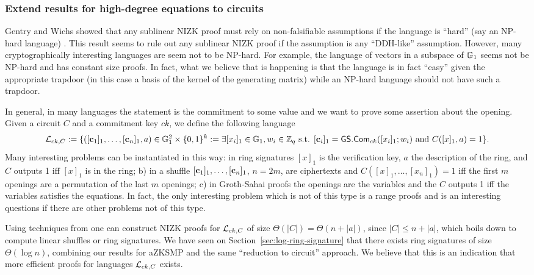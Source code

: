 \subsubsection{Extend results for high-degree equations to circuits}
Gentry and Wichs showed that any sublinear NIZK proof must rely on non-falsifiable  assumptions if the language is ``hard'' (say an NP-hard language) \cite{STOC:GenWic11}. This result seems to rule out any sublinear NIZK proof if the assumption is any ``DDH-like'' assumption. However, many cryptographically interesting languages are seem not to be NP-hard. For example, the language of vectors in a subspace of $\mathbb{G}_1$ seems not be NP-hard and has constant size proofs. In fact, what we believe that is happening is that the language is in fact ``easy'' given the appropriate trapdoor (in this case a basis of the kernel of the generating matrix) while an NP-hard language should not have such a trapdoor.

In general, in many languages the statement is the commitment to some value and we want to prove some assertion about the opening. Given a circuit $C$ and a commitment key $ck$, we define the following language
$$
\mathcal{L}_{ck,C}:= \{([\mathbf{c}_1]_1,\ldots,[\mathbf{c}_n]_1,a)\in\mathbb{G}_1^2\times\{0,1\}^k:= \exists [x_i]_1\in\mathbb{G}_1,w_i\in\mathbb{Z}_q \text{ s.t. } [\mathbf{c}_i]_1={\mathsf{GS}}.\mathsf{Com}_{ck}([x_i]_1;w_i)\text{ and }C([x]_1,a)=1\}.
$$
Many interesting problems can be instantiated in this way: in ring signatures $[x]_1$ is the verification key, $a$ the description of the ring, and $C$ outputs 1 iff $[x]_1$ is in the ring; b) in a shuffle $[\mathbf{c}_1]_1,\ldots,[\mathbf{c}_n]_1$, $n=2m$, are ciphertexts and $C([x]_1,\ldots,[x_n]_1)=1$ iff the first $m$ openings are a permutation of the last $m$ openings; c) in Groth-Sahai proofs the openings are the variables and the $C$ outputs 1 iff the variables satisfies the equations. In fact, the only interesting problem which is not of this type is a range proofs and is an interesting questions if there are other problems not of this type.

Using techniques from \cite{EC:GroOstSah06} one can construct NIZK proofs for $\mathcal{L}_{ck,C}$ of size $\Theta(|C|)=\Theta(n+|a|)$, since $|C|\leq n+|a|$, which boils down to compute linear shuffles or ring signatures. We have seen on Section~\ref{sec:log-ring-signature} that there exists ring signatures of size $\Theta(\log n)$, combining our results for aZKSMP and the same ``reduction to circuit'' approach. We believe that this is an indication that more efficient proofs for languages $\mathcal{L}_{ck,C}$ exists.

\fi
